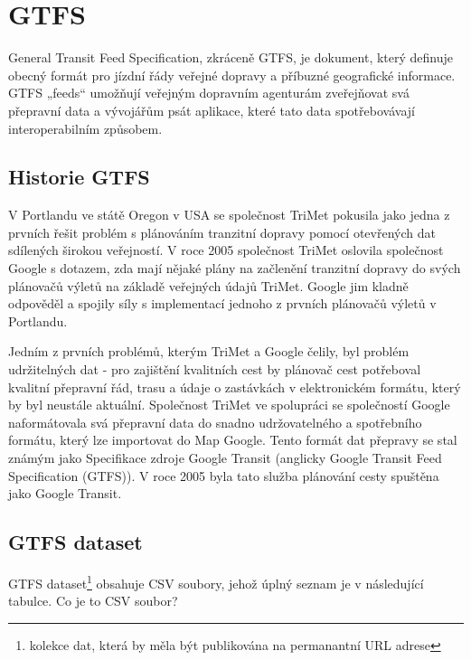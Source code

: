 \chapter{GTFS}
\label{2-teorie-gtfs}

General Transit Feed Specification, zkráceně GTFS, je dokument, který definuje
obecný formát pro jízdní řády veřejné dopravy a příbuzné geografické informace.
GTFS „feeds“ umožňují veřejným dopravním agenturám zveřejňovat svá přepravní
data a vývojářům psát aplikace, které tato data spotřebovávají interoperabilním
způsobem. \cite{gtfs-info}

\section{Historie GTFS}
V Portlandu ve státě Oregon v USA se společnost TriMet pokusila jako jedna z prvních 
řešit problém s plánováním tranzitní dopravy pomocí otevřených dat sdílených širokou veřejností.
V roce 2005 společnost TriMet oslovila společnost Google s dotazem, zda mají nějaké plány
na začlenění tranzitní dopravy do svých plánovačů výletů na základě veřejných údajů TriMet.
Google jim kladně odpověděl a spojily síly s implementací jednoho z prvních plánovačů výletů v Portlandu.

Jedním z prvních problémů, kterým TriMet a Google čelily, byl problém udržitelných dat 
- pro zajištění kvalitních cest by plánovač cest potřeboval kvalitní přepravní řád, 
trasu a údaje o zastávkách v elektronickém formátu, který by byl neustále aktuální. 
Společnost TriMet ve spolupráci se společností Google naformátovala svá přepravní 
data do snadno udržovatelného a spotřebního formátu, který lze importovat do Map Google. 
Tento formát dat přepravy se stal známým jako Specifikace zdroje Google Transit (anglicky
Google Transit Feed Specification (GTFS)). 
V roce 2005 byla tato služba plánování cesty spuštěna jako Google Transit. \cite{transitwiki}


\section{GTFS dataset}
GTFS dataset\footnote{kolekce dat, která by měla být publikována na permanantní URL adrese}
obsahuje CSV soubory, jehož úplný seznam je v následující tabulce. Co je to CSV soubor?

